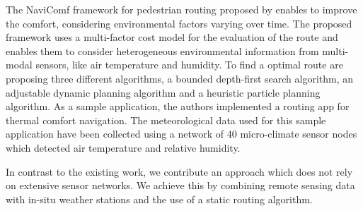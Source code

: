 The NaviComf framework for pedestrian routing proposed by \textcite{Dang2013} enables to improve the comfort, considering environmental factors varying over time. The proposed framework uses a multi-factor cost model for the evaluation of the route and enables them to consider heterogeneous environmental information from multi-modal sensors, like air temperature and humidity. To find a optimal route \textcite{Dang2013} are proposing three different algorithms,  a bounded depth-first search algorithm, an adjustable dynamic planning algorithm and a heuristic particle planning algorithm. As a sample application, the authors implemented a routing app for thermal comfort navigation. The meteorological data used for this sample application have been collected using a network of 40 micro-climate sensor nodes which detected air temperature and relative humidity. 

In contrast to the existing work, we contribute an approach which does not rely on extensive sensor networks. We achieve this by combining remote sensing data with in-situ weather stations and the use of a static routing algorithm.